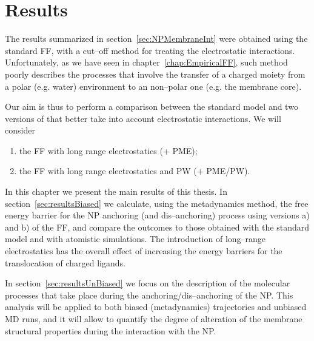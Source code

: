 \chapter{Results}
The results summarized in section~\ref{sec:NPMembraneInt} were obtained using the standard \martini \ac{FF}, with a cut--off method for treating the electrostatic interactions. Unfortunately, as we have seen in chapter~\ref{chap:EmpiricalFF}, such method poorly describes the processes that involve the transfer of a charged moiety from a polar (e.g. water) environment to an non--polar one (e.g. the membrane core).

Our aim is thus to perform a comparison between the standard \martini model and two versions of \martini that better take into account electrostatic interactions. We will consider 
\begin{enumerate}[label=\alph*)]
	\item the \martini \ac{FF} with long range electrostatics (\martini + \ac{PME});
	\item the \martini \ac{FF} with long range electrostatics and \ac{PW} (\martini + \ac{PME}/\acs{PW}).
\end{enumerate}

In this chapter we present the main results of this thesis. In section~\ref{sec:resultsBiased} we calculate, using the metadynamics method, the free energy barrier for the \ac{NP} anchoring (and dis--anchoring) process using versions a) and b) of the \martini \ac{FF}, and compare the outcomes to those obtained with the standard \martini model and with atomistic simulations. The introduction of long--range electrostatics has the overall effect of increasing the energy barriers for the translocation of charged ligands.

In section~\ref{sec:resultsUnBiased} we focus on the description of the molecular processes that take place during the anchoring/dis--anchoring of the \ac{NP}. This analysis will be applied to both biased (metadynamics) trajectories and unbiased \ac{MD} runs, and it will allow to quantify the degree of alteration of the membrane structural properties during the interaction with the \ac{NP}.

